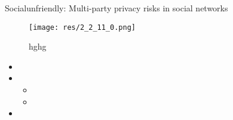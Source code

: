 \begin{frame}{Social}{unfriendly: Multi-party privacy risks in social networks \cite{thomas_unfriendly_2010}}

			
	\begin{figure}
		\texttt{[image: res/2\_2\_11\_0.png]}
		\caption{\label{fig:2_2_11_0}hghg}
	\end{figure}
				
	\begin{itemize}
		\item 
		
		\item 
			\begin{itemize}
				\item 
				\item 
			\end{itemize}
		
		\item 
	\end{itemize}
	
\end{frame}
